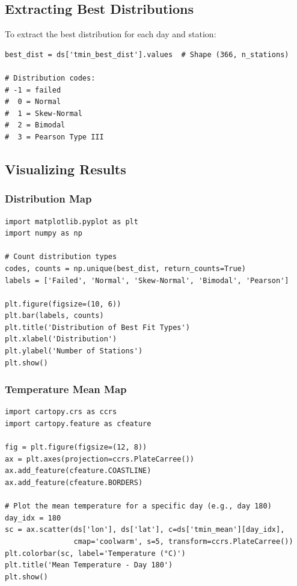 ﻿\documentclass[12pt,a4paper]{report}
\begin{document}
\subsection{Extracting Best Distributions}
To extract the best distribution for each day and station:

\begin{lstlisting}[caption=Extracting Best Distributions]
best_dist = ds['tmin_best_dist'].values  # Shape (366, n_stations)

# Distribution codes:
# -1 = failed
#  0 = Normal
#  1 = Skew-Normal
#  2 = Bimodal
#  3 = Pearson Type III
\end{lstlisting}

\subsection{Visualizing Results}
\subsubsection{Distribution Map}
\begin{lstlisting}[caption=Creating a Distribution Map]
import matplotlib.pyplot as plt
import numpy as np

# Count distribution types
codes, counts = np.unique(best_dist, return_counts=True)
labels = ['Failed', 'Normal', 'Skew-Normal', 'Bimodal', 'Pearson']

plt.figure(figsize=(10, 6))
plt.bar(labels, counts)
plt.title('Distribution of Best Fit Types')
plt.xlabel('Distribution')
plt.ylabel('Number of Stations')
plt.show()
\end{lstlisting}

\subsubsection{Temperature Mean Map}
\begin{lstlisting}[caption=Plotting Mean Temperature]
import cartopy.crs as ccrs
import cartopy.feature as cfeature

fig = plt.figure(figsize=(12, 8))
ax = plt.axes(projection=ccrs.PlateCarree())
ax.add_feature(cfeature.COASTLINE)
ax.add_feature(cfeature.BORDERS)

# Plot the mean temperature for a specific day (e.g., day 180)
day_idx = 180
sc = ax.scatter(ds['lon'], ds['lat'], c=ds['tmin_mean'][day_idx], 
                cmap='coolwarm', s=5, transform=ccrs.PlateCarree())
plt.colorbar(sc, label='Temperature (°C)')
plt.title('Mean Temperature - Day 180')
plt.show()
\end{lstlisting}
\end{document}
